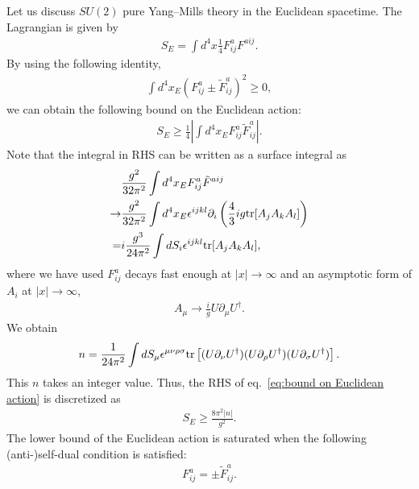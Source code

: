 \documentclass[11pt,a4paper]{article}
\begin{document}
Let us discuss $SU(2)$ pure Yang--Mills theory in the Euclidean spacetime. The Lagrangian is given by
\begin{align}
    S_E = \int d^4 x \frac{1}{4} F_{ij}^a F^{aij}.
\end{align}
By using the following identity,
\begin{align}
\int d^4x_E (F_{ij}^a \pm \tilde F_{ij}^a )^2 \geq 0,
\end{align}
we can obtain the following bound on the Euclidean action:
\begin{align}
S_E \geq \frac{1}{4} \left| \int d^4x_E F_{ij}^a \tilde F_{ij}^a \right|. \label{eq:bound on Euclidean action}
\end{align}
Note that the integral in RHS can be written as a surface integral as
\begin{align}
    & \frac{g^2}{32\pi^2} \int d^4 x_E F_{ij}^a \tilde F^{aij} \nonumber\\
    \to& \frac{g^2}{32\pi^2} \int d^4 x_E \epsilon^{ijkl} \partial_i \left( \frac{4}{3}ig {\rm tr}[A_j A_k A_l] \right) \nonumber\\
    =& i \frac{g^3}{24\pi^2} \int dS_i \epsilon^{ijkl} {\rm tr}[ A_j A_k A_l],
\end{align}
where we have used $F_{ij}^a$ decays fast enough at $|x| \to \infty$
and an asymptotic form of $A_i$ at $|x| \to \infty$,
\begin{align}
    A_\mu \to \frac{i}{g} U \partial_\mu U^\dagger.
\end{align}
We obtain
\begin{align}
    n = \frac{1}{24\pi^2} \int dS_\mu \epsilon^{\mu\nu\rho\sigma} {\rm tr} \left[ (U \partial_\nu U^\dagger) (U \partial_\rho U^\dagger) (U \partial_\sigma U^\dagger) \right]. \label{eq:topological charge}
\end{align}
This $n$ takes an integer value.
Thus, the RHS of eq.~\eqref{eq:bound on Euclidean action} is discretized as
\begin{align}
    S_E \geq \frac{8\pi^2 |n|}{g^2}.
\end{align}
The lower bound of the Euclidean action is saturated when the following (anti-)self-dual condition is satisfied:
\begin{align}
F_{ij}^a = \pm \tilde F_{ij}^a.
\end{align}
\end{document}
